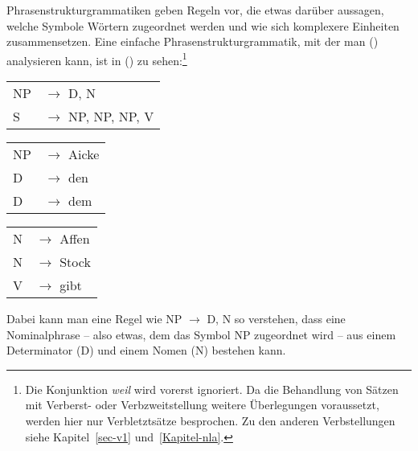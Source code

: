 Phrasenstrukturgrammatiken geben Regeln vor, die etwas darüber aussagen, welche Symbole Wörtern
zugeordnet werden und wie sich komplexere Einheiten zusammensetzen. Eine einfache Phrasenstrukturgrammatik,
mit der man () analysieren kann, ist in () zu sehen:\footnote{
  Die Konjunktion \emph{weil} wird vorerst ignoriert. Da die Behandlung von Sätzen mit Verberst- oder
  Verbzweitstellung weitere Überlegungen voraussetzt, werden hier nur Verbletztsätze besprochen.
  Zu den anderen Verbstellungen siehe Kapitel~\ref{sec-v1} und~\ref{Kapitel-nla}.%
}
\ea
\label{bsp-grammatik-psg}
\begin{tabular}[t]{@{}l@{ }l}
{NP} & {$\to$ D, N}\\          
{S}  & {$\to$ NP, NP, NP, V}
\end{tabular}\hspace{2cm}%
\begin{tabular}[t]{@{}l@{ }l}
{NP} & {$\to$ Aicke}\\
{D}  & {$\to$ den}\\
{D}  & {$\to$ dem}\\
\end{tabular}\hspace{8mm}
\begin{tabular}[t]{@{}l@{ }l}
{N} & {$\to$ Affen}\\
{N} & {$\to$ Stock}\\
{V} & {$\to$ gibt}\\
\end{tabular}
\z
Dabei kann man eine Regel wie NP $\to$\is{$\to$} D, N so verstehen, dass eine Nominalphrase -- also etwas,
dem das Symbol NP zugeordnet wird -- aus einem Determinator (D) und einem Nomen (N) bestehen kann.

